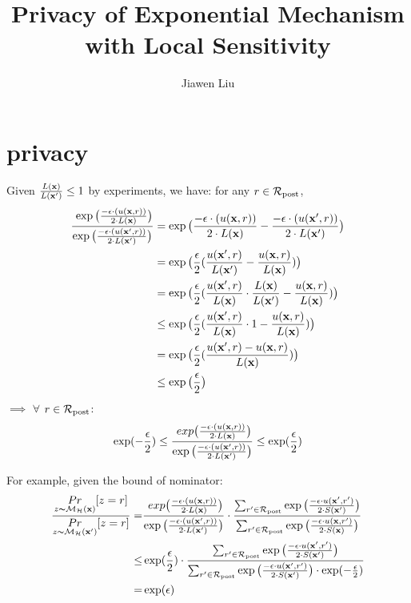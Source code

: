 \documentclass{article}
\begin{document}
\title{Privacy of Exponential Mechanism with Local Sensitivity}

\author[*]{Jiawen Liu}
\maketitle

\section{privacy}
Given $\frac{L(\textbf{x})}{L(\textbf{x}')} \leq 1$ by experiments, we have: for any $r \in \mathcal{R}_{\textup{post}}$,
  \begin{equation*}
  \begin{split}
  \frac {\
  \exp\big(
  \frac{-\epsilon\cdot(u(\textbf{x}, {r}))}{2\cdot L(\textbf{x})}
  \big)}
  {\exp\big(
  \frac
  {-\epsilon\cdot(u(\textbf{x}', {r}))}{2\cdot L(\textbf{x}')}
  \big)}
  & = \exp\big(
  \frac{-\epsilon\cdot(u(\textbf{x}, {r}))}{2\cdot L(\textbf{x})}
  - 
  \frac{-\epsilon\cdot(u(\textbf{x}', {r}))}{2\cdot L(\textbf{x}')}
  \big)\\
  & = \exp
  \big(
  \frac{\epsilon}{2}
  (\frac{u(\textbf{x}', {r})}{L(\textbf{x}')}
  - 
  \frac{u(\textbf{x}, {r})}{ L(\textbf{x})})
  \big)\\
  & = \exp
  \big(
  \frac{\epsilon}{2}
  (\frac{u(\textbf{x}', {r})}{ L(\textbf{x})}\cdot \frac{L(\textbf{x})}{L(\textbf{x}')}
  - 
  \frac{u(\textbf{x}, {r})}{L(\textbf{x})} )
  \big)\\
  & \leq \exp
  \big(
  \frac{\epsilon}{2}
  (\frac{u(\textbf{x}', {r})}{ L(\textbf{x})}\cdot 1
  - 
  \frac{u(\textbf{x}, {r})}{L(\textbf{x})})
  \big)\\
  & = \exp
  \big(
  \frac{\epsilon}{2}
  (\frac{u(\textbf{x}', {r}) - u(\textbf{x}, {r})}{L(\textbf{x})})
  \big)\\
  & \leq \exp
  \big(
  \frac{\epsilon}{2}
  \big)
  \end{split}
  \end{equation*}
$\implies $ $\forall$ $r \in \mathcal{R}_{\textup{post}}$:
$$
\exp(-\frac{\epsilon}{2}) \leq \frac {\
  exp\big(
  \frac{-\epsilon\cdot(u(\textbf{x}, {r}))}{2\cdot L(\textbf{x})}
  \big)}
  {\exp\big(
  \frac
  {-\epsilon\cdot(u(\textbf{x}', {r}))}{2\cdot L(\textbf{x}')}
  \big)}
\leq \exp(\frac{\epsilon}{2})
$$

For example, given the bound of nominator:
\begin{align*}
\frac{\underset{z \thicksim \mathcal{M}_{\mathcal{H}}(\textbf{x})}{Pr}[z = r]}{\underset{z \thicksim \mathcal{M}_{\mathcal{H}}(\textbf{x}')}{Pr}[z = r]}
= & \frac {\
  exp\big(
  \frac{-\epsilon\cdot(u(\textbf{x}, {r}))}{2\cdot L(\textbf{x})}
  \big)}
  {\exp\big(
  \frac
  {-\epsilon\cdot(u(\textbf{x}', {r}))}{2\cdot L(\textbf{x}')}
  \big)} 
  \cdot
  \frac{\sum_{r'\in \mathcal{R}_{\textup{post}}} \exp \big(\frac{-\epsilon\cdot u(\textbf{x}', r')}{2 \cdot S(\textbf{x}')}\big)}{\sum_{r'\in \mathcal{R}_{\textup{post}}} \exp \big(\frac{-\epsilon\cdot u(\textbf{x}, r')}{2 \cdot S(\textbf{x})}\big)}
  \\
\leq & \exp(\frac{\epsilon}{2}) 
\cdot 
\frac{\sum_{r'\in \mathcal{R}_{\textup{post}}} \exp \big(\frac{-\epsilon\cdot u(\textbf{x}', r')}{2 \cdot S(\textbf{x}')}\big)}
{\sum_{r'\in \mathcal{R}_{\textup{post}}} \exp \big(\frac{-\epsilon\cdot u(\textbf{x}', r')}{2 \cdot S(\textbf{x}')}\big)\cdot \exp(-\frac{\epsilon}{2})}\\
= & \exp(\epsilon)
\end{align*}
\end{document}
